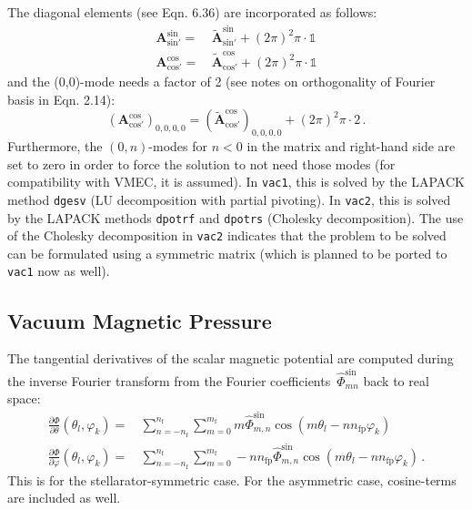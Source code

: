 The diagonal elements (see Eqn. 6.36) are incorporated as follows:
\begin{align}
 \mathbf{A}^\textrm{sin}_{\textrm{sin}'}
 =&\, \tilde{\mathbf{A}}^\textrm{sin}_{\textrm{sin}'} + (2 \pi)^2 \pi \cdot \mathbb{1} \\
 \mathbf{A}^\textrm{cos}_{\textrm{cos}'}
 =&\, \tilde{\mathbf{A}}^\textrm{cos}_{\textrm{cos}'} + (2 \pi)^2 \pi \cdot \mathbb{1}
\end{align}
and the (0,0)-mode needs a factor of 2 (see notes on orthogonality of Fourier basis in Eqn. 2.14):
\begin{equation}
 \left( \mathbf{A}^\textrm{cos}_{\textrm{cos}'} \right)_{0, 0, 0, 0}
 = \left( \tilde{\mathbf{A}}^\textrm{cos}_{\textrm{cos}'} \right)_{0, 0, 0, 0} + (2 \pi)^2 \pi \cdot 2 \, .
\end{equation}
Furthermore, the $(0,n)$-modes for $n < 0$ in the matrix and right-hand side are set to zero
in order to force the solution to not need those modes (for compatibility with VMEC, it is assumed).
In \texttt{vac1}, this is solved by the LAPACK method \texttt{dgesv} (LU decomposition with partial pivoting).
In \texttt{vac2}, this is solved by the LAPACK methods \texttt{dpotrf} and \texttt{dpotrs} (Cholesky decomposition).
The use of the Cholesky decomposition in \texttt{vac2} indicates that the problem to be solved
can be formulated using a symmetric matrix (which is planned to be ported to \texttt{vac1} now as well).

\FloatBarrier
\subsection{Vacuum Magnetic Pressure}
The tangential derivatives of the scalar magnetic potential
are computed during the inverse Fourier transform
from the Fourier coefficients~$\hat{\Phi}^\textrm{sin}_{mn}$ back to real space:
\begin{align}
 \frac{\partial \Phi}{\partial \theta} (\theta_l, \varphi_k)
 =&\, \sum\limits_{n=-n_\textrm{f}}^{n_\textrm{f}} \sum\limits_{m=0}^{m_\textrm{f}}
       m               \hat{\Phi}^\textrm{sin}_{m,n} \cos(m \theta_l - n n_\textrm{fp} \varphi_k) \\
 \frac{\partial \Phi}{\partial \varphi} (\theta_l, \varphi_k)
 =&\, \sum\limits_{n=-n_\textrm{f}}^{n_\textrm{f}} \sum\limits_{m=0}^{m_\textrm{f}}
      -n n_\textrm{fp} \hat{\Phi}^\textrm{sin}_{m,n} \cos(m \theta_l - n n_\textrm{fp} \varphi_k) \, .
\end{align}
This is for the stellarator-symmetric case.
For the asymmetric case, cosine-terms are included as well.

